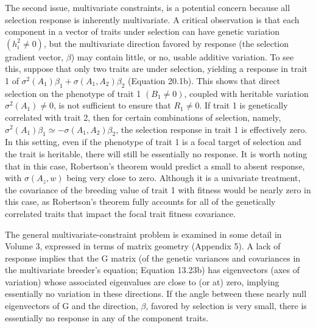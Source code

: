 \documentclass{article}
\begin{document}
The second issue, multivariate constraints, is a potential concern because all selection response is inherently multivariate. A critical observation is that each component in a vector of traits under selection can have genetic variation  $ (h_i^2 \neq 0) $, but the multivariate direction favored by response (the selection gradient vector,  $ \beta $) may contain little, or no, usable additive variation. To see this, suppose that only two traits are under selection, yielding a response in trait 1 of  $ \sigma^2(A_1)\beta_1 + \sigma(A_1, A_2)\beta_2 $ (Equation 20.1b). This shows that direct selection on the phenotype of trait 1  $ (B_1 \neq 0) $, coupled with heritable variation  $ \sigma^2(A_1) \neq 0 $, is not sufficient to ensure that  $ R_1 \neq 0 $. If trait 1 is genetically correlated with trait 2, then for certain combinations of selection, namely,  $ \sigma^2(A_1)\beta_1 \simeq -\sigma(A_1, A_2)\beta_2 $, the selection response in trait 1 is effectively zero. In this setting, even if the phenotype of trait 1 is a focal target of selection and the trait is heritable, there will still be essentially no response. It is worth noting that in this case, Robertson's theorem would predict a small to absent response, with  $ \sigma(A_z, w) $ being very close to zero. Although it is a univariate treatment, the covariance of the breeding value of trait 1 with fitness would be nearly zero in this case, as Robertson's theorem fully accounts for all of the genetically correlated traits that impact the focal trait fitness covariance.

The general multivariate-constraint problem is examined in some detail in Volume 3, expressed in terms of matrix geometry (Appendix 5). A lack of response implies that the G matrix (of the genetic variances and covariances in the multivariate breeder's equation; Equation 13.23b) has eigenvectors (axes of variation) whose associated eigenvalues are close to (or at) zero, implying essentially no variation in these directions. If the angle between these nearly null eigenvectors of G and the direction,  $ \beta $, favored by selection is very small, there is essentially no response in any of the component traits.
\end{document}

